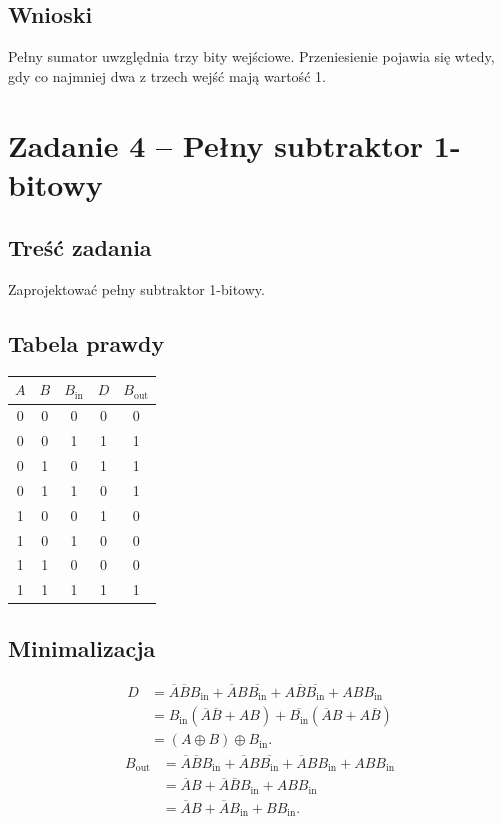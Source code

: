 \documentclass[12pt,a4paper]{article}
\newcommand{\xor}{\mathbin{\oplus}}
\begin{document}
\subsection{Wnioski}
Pełny sumator uwzględnia trzy bity wejściowe. Przeniesienie pojawia się wtedy, gdy co najmniej dwa z trzech wejść mają wartość 1.
\section{Zadanie 4 -- Pełny subtraktor 1-bitowy}
\subsection{Treść zadania}
Zaprojektować pełny subtraktor 1-bitowy.
\subsection{Tabela prawdy}
\begin{center}
\begin{tabular}{ccc|cc}
\toprule
$A$&$B$&$B_{\mathrm{in}}$&$D$&$B_{\mathrm{out}}$\\
\midrule
0&0&0&0&0\\
0&0&1&1&1\\
0&1&0&1&1\\
0&1&1&0&1\\
1&0&0&1&0\\
1&0&1&0&0\\
1&1&0&0&0\\
1&1&1&1&1\\
\bottomrule
\end{tabular}
\end{center}
\subsection{Minimalizacja}
\[
\begin{aligned}
D&=\overline{A}\overline{B}B_{\mathrm{in}}
 +\overline{A}B\overline{B_{\mathrm{in}}}
 +A\overline{B}\overline{B_{\mathrm{in}}}+ABB_{\mathrm{in}}\\
 &=B_{\mathrm{in}}(\overline{A}\overline{B}+AB)
  +\overline{B_{\mathrm{in}}}(\overline{A}B+A\overline{B})\\
 &=(A\xor B)\xor B_{\mathrm{in}}.
\end{aligned}
\]
\[
\begin{aligned}
B_{\mathrm{out}}&=\overline{A}\overline{B}B_{\mathrm{in}}
 +\overline{A}B\overline{B_{\mathrm{in}}}
 +\overline{A}BB_{\mathrm{in}}+ABB_{\mathrm{in}}\\
 &=\overline{A}B+\overline{A}\overline{B}B_{\mathrm{in}}+ABB_{\mathrm{in}}\\
 &=\overline{A}B+\overline{A}B_{\mathrm{in}}+BB_{\mathrm{in}}.
\end{aligned}
\]
\end{document}
